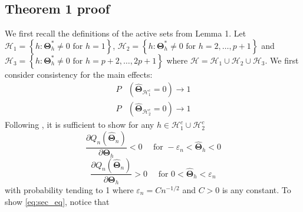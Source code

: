 \documentclass[12pt,letter]{article}\usepackage[]{graphicx}\usepackage[]{color}
\newcommand{\bTheta}{\boldsymbol{\Theta}}
\newcommand{\bThetastar}{\boldsymbol{\Theta}^{*}}
\begin{document}
\subsection{Theorem 1 proof} \label{ap:theorem1proof}
We first recall the definitions of the active sets from Lemma 1. Let $\mathcal{H}_1=\left\lbrace h : \bThetastar_h \neq 0 \textrm{ for }h=1 \right\rbrace$, $\mathcal{H}_2=\left\lbrace h : \bThetastar_h \neq 0 \textrm{ for }h=2, \ldots, p+1 \right\rbrace$ and $\mathcal{H}_3=\left\lbrace h : \bThetastar_h \neq 0 \textrm{ for }h=p+2, \ldots, 2p+1 \right\rbrace$ where $\mathcal{H} = \mathcal{H}_1 \cup \mathcal{H}_2 \cup \mathcal{H}_3$. We first consider consistency for the main effects: 
\begin{align*}
P&\left(\widehat{\bTheta}_{\mathcal{H}_{1}^{c}}=0\right)\rightarrow 1 \\
P&\left(\widehat{\bTheta}_{\mathcal{H}_2^c}=0\right)\rightarrow 1
\end{align*}
Following \citep{fan2001variable,choi2010variable}, it is sufficient to show for any $h\in\mathcal{H}_{1}^{c} \cup \mathcal{H}_2^c$ 
\begin{equation}
\frac{\partial Q_{n}\left(\widehat{\boldsymbol{\Theta}}_{n}\right)}{\partial\bTheta_{h}}<0\quad\text{ for }-\varepsilon_{n}<\widehat{\bTheta}_{h}<0\label{eq:first_eq}
\end{equation}
\begin{equation}
\frac{\partial Q_{n}\left(\widehat{\boldsymbol{\Theta}}_{n}\right)}{\partial\bTheta_{h}}>0\quad\text{ for }0<\widehat{\bTheta}_{h}<\varepsilon_{n}\label{eq:sec_eq}
\end{equation}
with probability tending to 1 where $\varepsilon_{n}=Cn^{-1/2}$ and
$C>0$ is any constant. To show \eqref{eq:sec_eq}, notice that 
\end{document}
